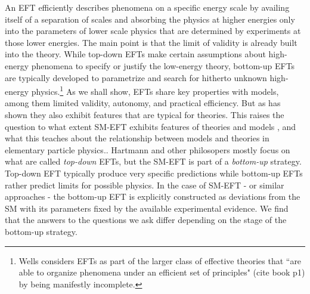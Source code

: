 An EFT {\MSnote efficiently describes phenomena on a specific energy scale by availing itself of a separation of scales and absorbing the physics at higher energies only into the parameters of lower scale physics that are determined by experiments at those lower energies. The main point is that the limit of validity is already built into the theory. While top-down EFTs make certain assumptions about high-energy phenomena to specify or justify the low-energy theory, bottom-up EFTs are typically developed to parametrize and search for hitherto unknown high-energy physics.\footnote{Wells considers EFTs as part of the larger class of effective theories that ``are able to organize phenomena under an efficient set of principles" (cite book p1) by being manifestly incomplete.}}
{\MSnote As we shall show, EFTs share key properties with models, among them limited validity, autonomy, and practical efficiency.} 
But as \citet{hartmann2001} has shown they also exhibit features that are typical for theories. 
This raises the question to what extent SM-EFT exhibits features of theories and models {\MSnote , and what this teaches about the relationship between models and theories in elementary particle physics.}.
Hartmann and other philosopers mostly focus on what are called \textit{top-down} EFTs, but the SM-EFT is part of a \textit{bottom-up} strategy. {\MSnote Top-down EFT typically produce very specific predictions while bottom-up EFTs rather predict limits for possible physics. In the case of SM-EFT - or similar approaches - the bottom-up EFT is explicitly constructed as deviations from the SM with its parameters fixed by the available experimental evidence. }
We find that the answers to the questions we ask differ depending on the stage of the bottom-up strategy.

